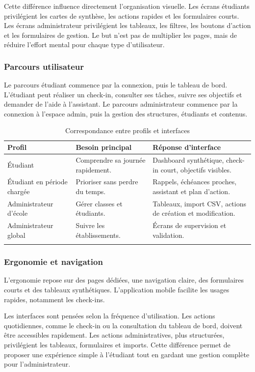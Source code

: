 \documentclass{rapportENSET}
\begin{document}
Cette différence influence directement l'organisation visuelle. Les écrans étudiants privilégient les cartes de synthèse, les actions rapides et les formulaires courts. Les écrans administrateur privilégient les tableaux, les filtres, les boutons d'action et les formulaires de gestion. Le but n'est pas de multiplier les pages, mais de réduire l'effort mental pour chaque type d'utilisateur.

\subsubsection*{Parcours utilisateur}
Le parcours étudiant commence par la connexion, puis le tableau de bord. L'étudiant peut réaliser un check-in, consulter ses tâches, suivre ses objectifs et demander de l'aide à l'assistant. Le parcours administrateur commence par la connexion à l'espace admin, puis la gestion des structures, étudiants et contenus.

\begin{longtable}{@{}L{0.24\textwidth}L{0.32\textwidth}L{0.34\textwidth}@{}}
\toprule
\textbf{Profil} & \textbf{Besoin principal} & \textbf{Réponse d'interface} \\
\midrule
\endhead
Étudiant & Comprendre sa journée rapidement. & Dashboard synthétique, check-in court, objectifs visibles. \\
Étudiant en période chargée & Prioriser sans perdre du temps. & Rappels, échéances proches, assistant et plan d'action. \\
Administrateur d'école & Gérer classes et étudiants. & Tableaux, import CSV, actions de création et modification. \\
Administrateur global & Suivre les établissements. & Écrans de supervision et validation. \\
\bottomrule
\caption{Correspondance entre profils et interfaces}
\end{longtable}

\subsubsection*{Ergonomie et navigation}
L'ergonomie repose sur des pages dédiées, une navigation claire, des formulaires courts et des tableaux synthétiques. L'application mobile facilite les usages rapides, notamment les check-ins.

Les interfaces sont pensées selon la fréquence d'utilisation. Les actions quotidiennes, comme le check-in ou la consultation du tableau de bord, doivent être accessibles rapidement. Les actions administratives, plus structurées, privilégient les tableaux, formulaires et imports. Cette différence permet de proposer une expérience simple à l'étudiant tout en gardant une gestion complète pour l'administrateur.
\end{document}

